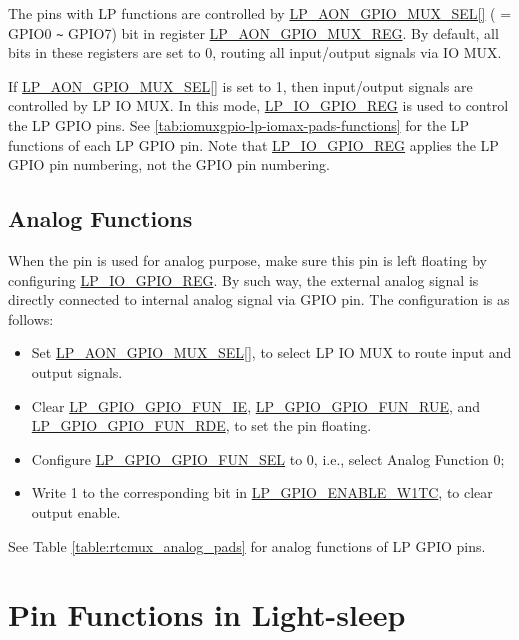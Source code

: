 \documentclass[main\_\_EN.tex]{subfiles}
\begin{document}
The pins with LP functions are controlled by \hyperref[fielddesc:LPAONGPIOMUXSEL]{LP\_AON\_GPIO\_MUX\_SEL[]} ( = GPIO0 \verb+~+ GPIO7) bit in register \hyperref[regdesc:LPAONGPIOMUXREG]{LP\_AON\_GPIO\_MUX\_REG}. By default, all bits in these registers are set to 0, routing all input/output signals via IO MUX.

If \hyperref[fielddesc:LPAONGPIOMUXSEL]{LP\_AON\_GPIO\_MUX\_SEL[]} is set to 1, then input/output signals are controlled by LP IO MUX. In this mode, \hyperref[regdesc:LPIOGPIONREG]{LP\_IO\_GPIO\_REG} is used to control the LP GPIO pins. See  \ref{tab:iomuxgpio-lp-iomax-pads-functions} for the LP functions of each LP GPIO pin. Note that  \hyperref[regdesc:LPIOGPIONREG]{LP\_IO\_GPIO\_REG} applies the LP GPIO pin numbering, not the GPIO pin numbering.

\subsection{Analog Functions}

When the pin is used for analog purpose, make sure this pin is left floating by configuring \hyperref[regdesc:LPIOGPIONREG]{LP\_IO\_GPIO\_REG}. By such way, the external analog signal is directly connected to internal analog signal via GPIO pin. The configuration is as follows:

\begin{itemize}
    \item Set \hyperref[fielddesc:LPAONGPIOMUXSEL]{LP\_AON\_GPIO\_MUX\_SEL[]}, to select LP IO MUX to route input and output signals.
    \item Clear  \hyperref[regdesc:LPIOGPIONREG]{LP\_GPIO\_GPIO\_FUN\_IE}, \hyperref[regdesc:LPIOGPIONREG]{LP\_GPIO\_GPIO\_FUN\_RUE}, and \hyperref[regdesc:LPIOGPIONREG]{LP\_GPIO\_GPIO\_FUN\_RDE}, to set the pin floating.
    \item Configure \hyperref[regdesc:LPIOGPIONREG]{LP\_GPIO\_GPIO\_FUN\_SEL} to 0, i.e., select Analog Function 0;
    \item Write 1 to the corresponding bit in  \hyperref[regdesc:LPIOENABLEW1TCREG]{LP\_GPIO\_ENABLE\_W1TC}, to clear output enable.
\end{itemize}
See Table \ref{table:rtcmux_analog_pads} for analog functions of LP GPIO pins.

\section{Pin Functions in Light-sleep}\label{sec:iomuxgpio-pin-func-light-sleep}
\end{document}
